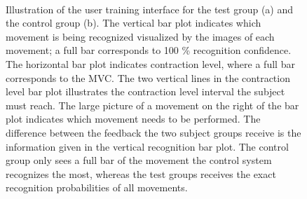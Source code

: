 \begin{figure}[H] 
	\centering
	 \\
	\caption{Illustration of the user training interface for the test group (a) and the control group (b). The vertical bar plot indicates which movement is being recognized visualized by the images of each movement; a full bar corresponds to 100 \% recognition confidence. The horizontal bar plot indicates contraction level, where a full bar corresponds to the MVC. The two vertical lines in the contraction level bar plot illustrates the contraction level interval the subject must reach. The large picture of a movement on the right of the bar plot indicates which movement needs to be performed. The difference between the feedback the two subject groups receive is the information given in the vertical recognition bar plot. The control group only sees a full bar of the movement the control system recognizes the most, whereas the test groups receives the exact recognition probabilities of all movements.}
	\label{fig:feedbackGUI}
\end{figure}

